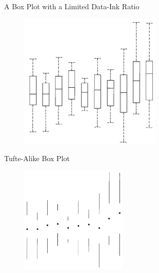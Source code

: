 \documentclass[aspectratio=1610]{beamer}
\begin{document}
\begin{frame}{A Box Plot with a Limited Data-Ink Ratio}{}
	\begin{figure}
		\begin{center}
			\includegraphics[width=0.6\textwidth]{images/trad_boxplot.png}
		\end{center}
	\end{figure}
\end{frame}

\begin{frame}{Tufte-Alike Box Plot}{}
	\begin{figure}
		\begin{center}
			\includegraphics[width=0.45\textwidth]{images/tufte_boxplot.png}
		\end{center}
	\end{figure}
\end{frame}
\end{document}
